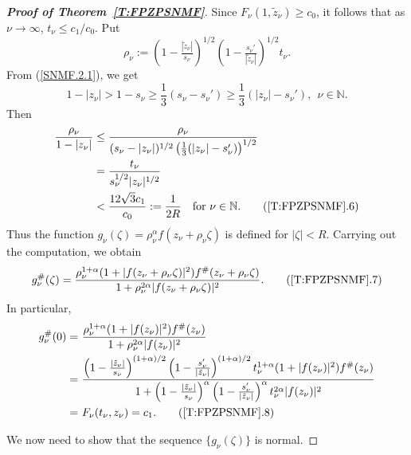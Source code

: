 \documentclass[11pt, reqno]{amsart}
\theoremstyle{definition}
\theoremstyle{remark}
\numberwithin{equation}{section}
\begin{document}
\begin{proof}[{\bf Proof of Theorem~\ref{T:FPZPSNMF}}]
Since $F_{\nu}(1,\tilde{z}_{\nu})\geq c_0$, it follows that as $\nu\to\infty$, $t_{\nu}\leq c_1/c_0$. Put
\begin{equation*}
\rho_{\nu} 
:=
\left(1-\tfrac{|\tilde{z}_{\nu}|}{s_{\nu}}\right)^{1/2} \left(1-\tfrac{s_{\nu}'}{|\tilde{z}_{\nu}|}\right)^{1/2} t_{\nu}.
\end{equation*}
From (\ref{SNMF.2.1}), we get
\begin{equation*}1-|z_{\nu}|>1-s_{\nu}\geq \frac{1}{3}(s_{\nu}-s_{\nu}')\geq \frac{1}{3}(|z_{\nu}|-s_{\nu}'),\ \ \nu\in\mathbb N.\end{equation*}
Then
\begin{align*}
\frac{\rho_{\nu} }{1-|z_{\nu}|}
&\le
\frac{\rho_{\nu} }{(s_{\nu}-|z_{\nu}|)^{1/2}\left(\frac{1}{3}(|z_{\nu}|-s_{\nu}')\right)^{1/2}}\\
&=
\frac{t_{\nu}}{s_{\nu}^{1/2}|z_{\nu}|^{1/2}}\\ &<\frac{12\sqrt{3}c_1}{c_0}:=\frac{1}{2R}
\quad \text{for } \nu\in \mathbb N .
\tag{\ref*{T:FPZPSNMF}.6} \label{SNMF.6}
\end{align*}
Thus the function
$
g_{\nu}(\zeta)
=
\rho_{\nu} ^{\alpha} f(z_{\nu}+\rho_{\nu} \zeta)
$
is defined for $|\zeta|<R$.
Carrying out the computation, we obtain
\begin{equation}
g_{\nu}^{\#}(\zeta)
=
\frac{\rho_{\nu} ^{1+\alpha}(1+|f(z_{\nu}+\rho_{\nu} \zeta)|^{2})f^{\#}(z_{\nu}+\rho_{\nu} \zeta)}
{1+\rho_{\nu} ^{2\alpha}|f(z_{\nu}+\rho_{\nu} \zeta)|^{2}} .
\tag{\ref*{T:FPZPSNMF}.7} \label{SNMF.7}
\end{equation}
In particular,
\begin{align*}
g_{\nu}^{\#}(0)
=&~
\frac{\rho_{\nu} ^{1+\alpha}(1+|f(z_{\nu})|^{2})f^{\#}(z_{\nu})}
{1+\rho_{\nu} ^{2\alpha}|f(z_{\nu})|^{2}}\\
=&~ \dfrac{\left(1-\tfrac{|\tilde{z}_{\nu}|}{s_{\nu}}\right)^{(1+\alpha)/2} \left(1-\tfrac{s_{\nu}'}{|\tilde{z}_{\nu}|}\right)^{(1+\alpha)/2} t_{\nu}^{1+\alpha}(1+|f(z_{\nu})|^{2})f^{\#}(z_{\nu})}{1+\left(1-\tfrac{|\tilde{z}_{\nu}|}{s_{\nu}}\right)^{\alpha} \left(1-\tfrac{s_{\nu}'}{|\tilde{z}_{\nu}|}\right)^{\alpha} t_{\nu}^{2\alpha}|f(z_{\nu})|^2}\\
=&~F_{\nu}(t_{\nu},z_{\nu})=c_1.
\tag{\ref*{T:FPZPSNMF}.8} \label{SNMF.8}
\end{align*}

We now need to show that the sequence $\{g_{\nu}(\zeta)\}$ is normal. 
\smallskip


\end{proof}
\end{document}
